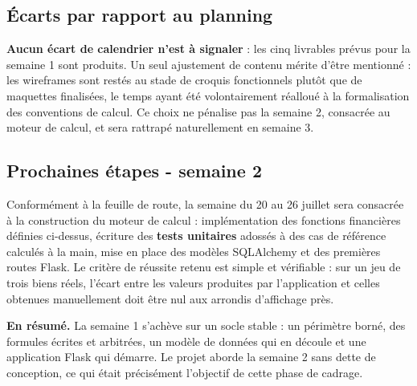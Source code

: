 \documentclass[11pt,a4paper]{article}
\begin{document}
	\subsection{Écarts par rapport au planning}
	\textbf{Aucun écart de calendrier n'est à signaler} : les cinq livrables prévus pour la semaine 1 sont produits. Un seul ajustement de contenu mérite d'être mentionné : les wireframes sont restés au stade de croquis fonctionnels plutôt que de maquettes finalisées, le temps ayant été volontairement réalloué à la formalisation des conventions de calcul. Ce choix ne pénalise pas la semaine 2, consacrée au moteur de calcul, et sera rattrapé naturellement en semaine 3.
	
	\subsection{Prochaines étapes - semaine 2}
	Conformément à la feuille de route, la semaine du 20 au 26 juillet sera consacrée à la construction du moteur de calcul : implémentation des fonctions financières définies ci-dessus, écriture des \textbf{tests unitaires} adossés à des cas de référence calculés à la main, mise en place des modèles SQLAlchemy et des premières routes Flask. Le critère de réussite retenu est simple et vérifiable : sur un jeu de trois biens réels, l'écart entre les valeurs produites par l'application et celles obtenues manuellement doit être nul aux arrondis d'affichage près.
	
	\vspace{0.6cm}
	
	\begin{tcolorbox}[colback=eccblue!5,colframe=eccblue!60,boxrule=0.6pt,arc=2pt,
		left=8pt,right=8pt,top=6pt,bottom=6pt]
		\small
		\textbf{\color{eccblue}En résumé.} La semaine 1 s'achève sur un socle stable : un périmètre borné, des formules écrites et arbitrées, un modèle de données qui en découle et une application Flask qui démarre. Le projet aborde la semaine 2 sans dette de conception, ce qui était précisément l'objectif de cette phase de cadrage.
	\end{tcolorbox}
	
\end{document}
